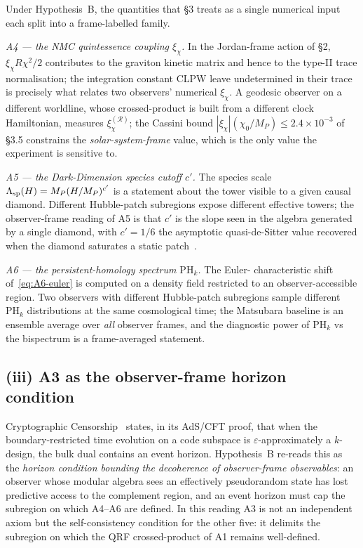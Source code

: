 Under Hypothesis~B, the quantities that \S3 treats as a single numerical input
each split into a frame-labelled family.

\emph{A4 --- the NMC quintessence coupling $\xi_\chi$.} In the Jordan-frame action
of \S2, $\xi_\chi R\chi^2/2$ contributes to the graviton kinetic matrix and hence
to the type-II trace normalisation; the integration constant CLPW leave
undetermined in their trace is precisely what relates two observers' numerical
$\xi_\chi$. A geodesic observer on a different worldline, whose crossed-product
is built from a different clock Hamiltonian, measures $\xi_\chi^{(\mathcal R)}$;
the Cassini bound $|\xi_\chi|(\chi_0/M_P) \le 2.4\times 10^{-3}$ of \S3.5
constrains the \emph{solar-system-frame} value, which is the only value the
experiment is sensitive to.

\emph{A5 --- the Dark-Dimension species cutoff $c'$.} The species scale
$\Lambda_{\rm sp}(H) = M_P (H/M_P)^{c'}$ is a statement about the tower visible to
a given causal diamond. Different Hubble-patch subregions expose different
effective towers; the observer-frame reading of A5 is that $c'$ is the slope
seen in the algebra generated by a single diamond, with $c' = 1/6$ the
asymptotic quasi-de-Sitter value recovered when the diamond saturates a static
patch~\cite{Montero2022,AAL2023}.

\emph{A6 --- the persistent-homology spectrum $\mathrm{PH}_k$.} The Euler-
characteristic shift of~\eqref{eq:A6-euler} is computed on a density field
restricted to an observer-accessible region. Two observers with different
Hubble-patch subregions sample different $\mathrm{PH}_k$ distributions at the
same cosmological time; the Matsubara baseline is an ensemble average over
\emph{all} observer frames, and the diagnostic power of $\mathrm{PH}_k$ vs
the bispectrum is a frame-averaged statement.

\subsection*{(iii) A3 as the observer-frame horizon condition}

Cryptographic Censorship~\cite{CryptoCensorship} states, in its AdS/CFT proof,
that when the boundary-restricted time evolution on a code subspace is
$\varepsilon$-approximately a $k$-design, the bulk dual contains an event
horizon. Hypothesis~B re-reads this as the \emph{horizon condition bounding the
decoherence of observer-frame observables}: an observer whose modular algebra
sees an effectively pseudorandom state has lost predictive access to the
complement region, and an event horizon must cap the subregion on which
A4--A6 are defined. In this reading A3 is not an independent axiom but the
self-consistency condition for the other five: it delimits the subregion on
which the QRF crossed-product of A1 remains well-defined.

